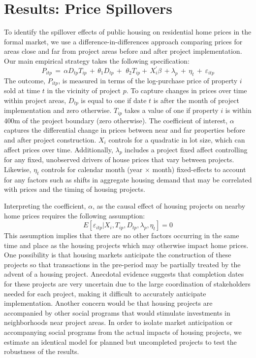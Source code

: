 \documentclass[12pt]{article}
\begin{document}
\section{Results: Price Spillovers}\label{section:resultsprices}

To identify the spillover effects of public housing on residential home prices in the formal market, we use a difference-in-differences approach comparing prices for areas close and far from project areas before and after project implementation.  Our main empirical strategy takes the following specification:
\begin{equation*}
P_{itp} \, = \, \alpha D_{tp}T_{ip} \, + \,\theta_1 D_{tp} \, + \, \,\theta_2 T_{ip}+ \, X^{'}_{i}\beta \, +  \lambda_p \,  + \, \eta_{t} \, + \, \varepsilon_{itp}
\end{equation*}
The outcome, $P_{itp}$, is measured in terms of the log-purchase price of property $i$ sold at time $t$ in the vicinity of project $p$.  To capture changes in prices over time within project areas, $D_{tp}$ is equal to one if date $t$ is after the month of project implementation and zero otherwise.  $T_{ip}$ takes a value of one if property $i$ is within 400m of the project boundary (zero otherwise).  The coefficient of interest, $\alpha$ captures the differential change in prices between near and far properties before and after project construction.  $X_i$ controls for a quadratic in lot size, which can affect prices over time.  Additionally, $\lambda_p$ includes a project fixed affect controlling for any fixed, unobserved drivers of house prices that vary between projects.  Likewise, $\eta_{t}$ controls for calendar month (year$\,\times\,$month) fixed-effects to account for any factors such as shifts in aggregate housing demand that may be correlated with prices and the timing of housing projects.

Interpreting the coefficient, $\alpha$, as the causal effect of housing projects on nearby home prices requires the following assumption:
\begin{equation*}
E[\varepsilon_{itp}|X_{i},T_{ip},D_{tp},\lambda_p,\eta_{t}]=0
\end{equation*}
This assumption implies that there are no other factors occurring in the same time and place as the housing projects which may otherwise impact home prices.  One possibility is that housing markets anticipate the construction of these projects so that transactions in the pre-period may be partially treated by the advent of a housing project.  Anecdotal evidence suggests that completion dates for these projects are very uncertain due to the large coordination of stakeholders needed for each project, making it difficult to accurately anticipate implementation.  Another concern would be that housing projects are accompanied by other social programs that would stimulate investments in neighborhoods near project areas.  In order to isolate market anticipation or accompanying social programs from the actual impacts of housing projects, we estimate an identical model for planned but uncompleted projects to test the robustness of the results.
\end{document}
